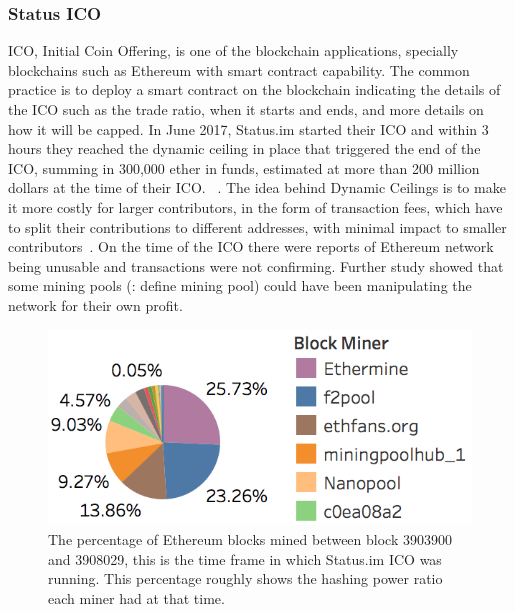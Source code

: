 \subsubsection{Status ICO} %




ICO, Initial Coin Offering, is one of the blockchain applications, specially blockchains such as Ethereum with smart contract capability. The common practice is to deploy a smart contract on the blockchain indicating the details of the ICO such as the trade ratio, when it starts and ends, and more details on how it will be capped.
In June 2017, Status.im started their ICO and within 3 hours they reached the dynamic ceiling in place that triggered the end of the ICO, summing in 300,000 ether in funds, estimated at more than 200 million dollars at the time of their ICO. ~\cite{statusicoanalysis}. The idea behind Dynamic Ceilings is to make it more costly for larger contributors,  in the form of transaction fees, which have to split their contributions to different addresses, with minimal impact to smaller contributors~\cite{statuswhitepaper}.
On the time of the ICO there were reports of Ethereum network being unusable and transactions were not confirming. Further study showed that some mining pools (\todo: define mining pool) could have been manipulating the network for their own profit.



\begin{figure}[h]
\centering
\includegraphics[width=0.5\linewidth]{figures/Mining_pool_ratio.png}
\caption{The percentage of Ethereum blocks mined between block 3903900 and 3908029, this is the time frame in which Status.im ICO was running. This percentage roughly shows the hashing power ratio each miner had at that time. \label{fig:mining_pool_ratio}} %
\end{figure}

